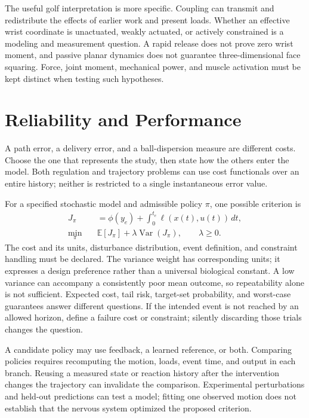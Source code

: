 \documentclass[12pt, openany]{book}
\theoremstyle{plain}
\begin{document}
The useful golf interpretation is more specific. Coupling can transmit and
redistribute the effects of earlier work and present loads. Whether an effective
wrist coordinate is unactuated, weakly actuated, or actively constrained is a
modeling and measurement question. A rapid release does not prove zero wrist
moment, and passive planar dynamics does not guarantee three-dimensional face
squaring. Force, joint moment, mechanical power, and muscle activation must be
kept distinct when testing such hypotheses.

\section{Reliability and Performance}

A path error, a delivery error, and a ball-dispersion measure are different
costs. Choose the one that represents the study, then state how the others
enter the model. Both regulation and trajectory problems can use cost
functionals over an entire history; neither is restricted to a single
instantaneous error value.

For a specified stochastic model and admissible policy $\pi$, one possible
criterion is
\begin{equation}
 \begin{aligned}
 J_\pi&=\phi(y_e)+\int_0^{t_e}\ell(x(t),u(t))\,dt,\\
 \min_\pi\quad&\mathbb E[J_\pi]+\lambda\operatorname{Var}(J_\pi),
 \qquad\lambda\geq0.
 \end{aligned}
 \label{eq:motion_risk_objective}
\end{equation}
The cost and its units, disturbance distribution, event definition, and
constraint handling must be declared. The variance weight has corresponding
units; it expresses a design preference rather than a universal biological
constant. A low variance can accompany a consistently poor mean outcome, so
repeatability alone is not sufficient. Expected cost, tail risk, target-set
probability, and worst-case guarantees answer different questions.
If the intended event is not reached by an allowed horizon, define a failure
cost or constraint; silently discarding those trials changes the question.

A candidate policy may use feedback, a learned reference, or both. Comparing
policies requires recomputing the motion, loads, event time, and output in each
branch. Reusing a measured state or reaction history after the intervention
changes the trajectory can invalidate the comparison. Experimental perturbations
and held-out predictions can test a model; fitting one observed motion does not
establish that the nervous system optimized the proposed criterion.
\end{document}
